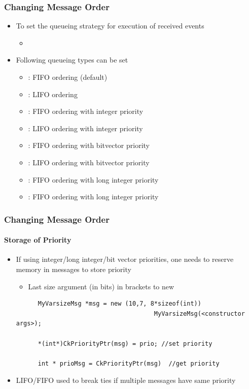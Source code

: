 \begin{frame}[fragile]
  \frametitle{Changing Message Order}
  \begin{itemize}
    \item To set the queueing strategy for execution of received events
    \begin{itemize}
      \item {}
    \end{itemize}
    \item Following queueing types can be set
    \begin{itemize}
      \item {} : FIFO ordering (default)
      \item {} : LIFO ordering
      \item {} : FIFO ordering with integer priority
      \item {} : LIFO ordering with integer priority
      \item {} : FIFO ordering with bitvector priority
      \item {} : LIFO ordering with bitvector priority
      \item {} : FIFO ordering with long integer priority
      \item {} : FIFO ordering with long integer priority
    \end{itemize}
 \end{itemize}
\end{frame}

\begin{frame}[fragile]
  \frametitle{Changing Message Order}
  \framesubtitle{Storage of Priority}
  \begin{itemize}
    \item If using integer/long integer/bit vector priorities, one needs to reserve memory in messages to store priority
     \begin{itemize}
       \item Last size argument (in bits) in brackets to new
     \end{itemize}
    \begin{lstlisting}
      MyVarsizeMsg *msg = new (10,7, 8*sizeof(int))         
                                      MyVarsizeMsg(<constructor args>);

      *(int*)CkPriorityPtr(msg) = prio; //set priority

      int * prioMsg = CkPriorityPtr(msg)  //get priority
    \end{lstlisting}
    \item LIFO/FIFO used to break ties if multiple messages have same priority
  \end{itemize}
\end{frame}

